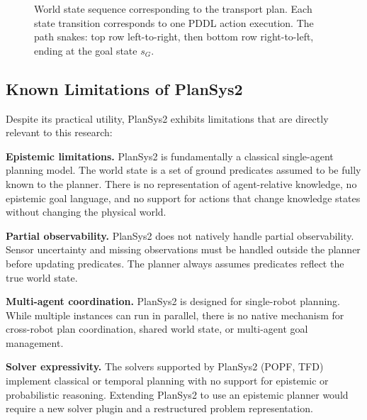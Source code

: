 \documentclass[12pt,a4paper]{article}
\theoremstyle{definition}
\theoremstyle{plain}
\begin{document}
\begin{figure}[H]
\caption{World state sequence corresponding to the transport plan. Each state transition
corresponds to one PDDL action execution. The path snakes: top row left-to-right, then
bottom row right-to-left, ending at the goal state $s_G$.}
\label{fig:statespace}
\end{figure}

\subsection{Known Limitations of PlanSys2}

Despite its practical utility, PlanSys2 exhibits limitations that are directly relevant to this
research:

\textbf{Epistemic limitations.} PlanSys2 is fundamentally a classical single-agent planning model.
The world state is a set of ground predicates assumed to be fully known to the planner. There is
no representation of agent-relative knowledge, no epistemic goal language, and no support for
actions that change knowledge states without changing the physical world.

\textbf{Partial observability.} PlanSys2 does not natively handle partial observability. Sensor
uncertainty and missing observations must be handled outside the planner before updating
predicates. The planner always assumes predicates reflect the true world state.

\textbf{Multi-agent coordination.} PlanSys2 is designed for single-robot planning. While multiple
instances can run in parallel, there is no native mechanism for cross-robot plan coordination,
shared world state, or multi-agent goal management.

\textbf{Solver expressivity.} The solvers supported by PlanSys2 (POPF, TFD) implement classical
or temporal planning with no support for epistemic or probabilistic reasoning. Extending PlanSys2
to use an epistemic planner would require a new solver plugin and a restructured problem
representation.
\end{document}
